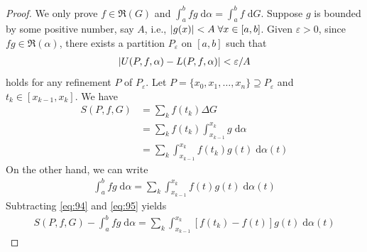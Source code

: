 \documentclass[thmcnt=section, 12pt]{my-elegantbook}
\begin{document}
\begin{proof}
    We only prove $f \in \mathfrak{R}(G)$ and $\int_{a}^{b} f g \; \mathrm{d}\alpha = \int_{a}^{b} f \; \mathrm{d}G$. Suppose $g$ is bounded by some positive number, say $A$, i.e., $\left\lvert g(x) \right\rvert < A \; \forall x \in [a, b]$. Given $\varepsilon > 0$, since $f g \in \mathfrak{R}(\alpha)$, there exists a partition $P_\varepsilon$ on $[a, b]$ such that
    \begin{align}
        \left\lvert U(P,f,\alpha) - L(P,f,\alpha) \right\rvert < \varepsilon / A
        \label{eq:96}
    \end{align}
    holds for any refinement $P$ of $P_\varepsilon$. Let $P = \{x_0, x_1, \ldots, x_n\} \supseteq P_\varepsilon$ and $t_k \in [x_{k-1}, x_k]$. We have
    \begin{align}
        S(P,f, G)
         & = \sum_k f(t_k) \Delta G \nonumber                                   \\
         & = \sum_k f(t_k) \int_{x_{k-1}}^{x_k} g \; \mathrm{d}\alpha \nonumber \\
         & = \sum_k \int_{x_{k-1}}^{x_k} f(t_k) g(t) \; \mathrm{d}\alpha(t)
        \label{eq:94}
    \end{align}
    On the other hand, we can write
    \begin{align}
        \int_{a}^{b} f g  \; \mathrm{d}\alpha
        = \sum_k \int_{x_{k-1}}^{x_k} f(t) g(t) \; \mathrm{d}\alpha(t)
        \label{eq:95}
    \end{align}
    Subtracting \eqref{eq:94} and \eqref{eq:95} yields
    \begin{align*}
        S(P,f, G) - \int_{a}^{b} f g  \; \mathrm{d}\alpha
        = \sum_k \int_{x_{k-1}}^{x_k} [f(t_k) - f(t)] g(t) \; \mathrm{d}\alpha(t)
    \end{align*}


\end{proof}
\end{document}
